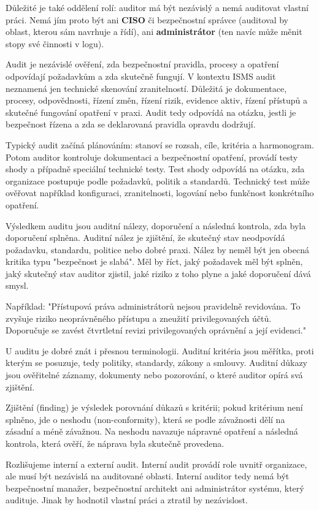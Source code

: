 Důležité je také oddělení rolí: auditor má být nezávislý a nemá auditovat vlastní práci. Nemá jím proto být ani \textbf{CISO} či bezpečnostní správce (auditoval by oblast, kterou sám navrhuje a řídí), ani \textbf{administrátor} (ten navíc může měnit stopy své činnosti v logu).

Audit je nezávislé ověření, zda bezpečnostní pravidla, procesy a opatření odpovídají požadavkům a zda skutečně fungují. V kontextu ISMS audit neznamená jen technické skenování zranitelností. Důležitá je dokumentace, procesy, odpovědnosti, řízení změn, řízení rizik, evidence aktiv, řízení přístupů a skutečné fungování opatření v praxi. Audit tedy odpovídá na otázku, jestli je bezpečnost řízena a zda se deklarovaná pravidla opravdu dodržují.

Typický audit začíná plánováním: stanoví se rozsah, cíle, kritéria a harmonogram. Potom auditor kontroluje dokumentaci a bezpečnostní opatření, provádí testy shody a případně speciální technické testy. Test shody odpovídá na otázku, zda organizace postupuje podle požadavků, politik a standardů. Technický test může ověřovat například konfiguraci, zranitelnosti, logování nebo funkčnost konkrétního opatření.

Výsledkem auditu jsou auditní nálezy, doporučení a následná kontrola, zda byla doporučení splněna. Auditní nález je zjištění, že skutečný stav neodpovídá požadavku, standardu, politice nebo dobré praxi. Nález by neměl být jen obecná kritika typu "bezpečnost je slabá". Měl by říct, jaký požadavek měl být splněn, jaký skutečný stav auditor zjistil, jaké riziko z toho plyne a jaké doporučení dává smysl.

Například: "Přístupová práva administrátorů nejsou pravidelně revidována. To zvyšuje riziko neoprávněného přístupu a zneužití privilegovaných účtů. Doporučuje se zavést čtvrtletní revizi privilegovaných oprávnění a její evidenci."

U auditu je dobré znát i přesnou terminologii. Auditní kritéria jsou měřítka, proti kterým se posuzuje, tedy politiky, standardy, zákony a smlouvy. Auditní důkazy jsou ověřitelné záznamy, dokumenty nebo pozorování, o které auditor opírá svá zjištění.

Zjištění (finding) je výsledek porovnání důkazů s kritérii; pokud kritérium není splněno, jde o neshodu (non-conformity), která se podle závažnosti dělí na zásadní a méně závažnou. Na neshodu navazuje nápravné opatření a následná kontrola, která ověří, že náprava byla skutečně provedena.

Rozlišujeme interní a externí audit. Interní audit provádí role uvnitř organizace, ale musí být nezávislá na auditované oblasti. Interní auditor tedy nemá být bezpečnostní manažer, bezpečnostní architekt ani administrátor systému, který audituje. Jinak by hodnotil vlastní práci a ztratil by nezávislost.

